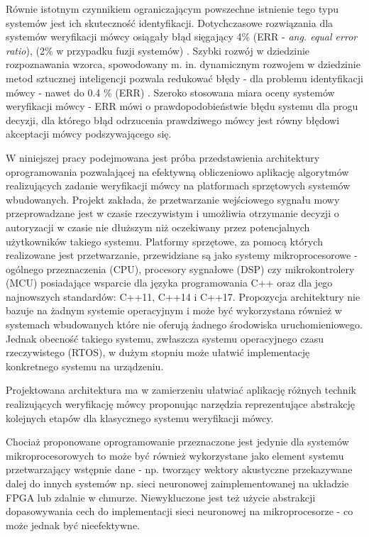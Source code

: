 Równie istotnym czynnikiem ograniczającym powszechne istnienie tego typu systemów jest ich skuteczność identyfikacji. Dotychczasowe rozwiązania dla systemów weryfikacji mówcy osiągały błąd sięgający 4\% (ERR - \textit{ang. equal error ratio}), (2\% w przypadku fuzji systemów) \cite{overview}. Szybki rozwój w dziedzinie rozpoznawania wzorca, spowodowany m. in. dynamicznym rozwojem w dziedzinie metod sztucznej inteligencji pozwala redukować błędy - dla problemu identyfikacji mówcy - nawet do 0.4 \% (ERR) \cite{deepfeaturelearning2017err}. Szeroko stosowana miara oceny systemów weryfikacji mówcy - ERR mówi o prawdopodobieństwie błędu systemu dla progu decyzji, dla którego błąd odrzucenia prawdziwego mówcy jest równy błędowi akceptacji mówcy podszywającego się.  

W niniejszej pracy podejmowana jest próba przedstawienia architektury oprogramowania pozwalającej na efektywną obliczeniowo aplikację algorytmów realizujących zadanie weryfikacji mówcy na platformach sprzętowych systemów wbudowanych. Projekt zakłada, że przetwarzanie wejściowego sygnału mowy przeprowadzane jest w czasie rzeczywistym i umożliwia otrzymanie decyzji o autoryzacji w czasie nie dłuższym niż oczekiwany przez potencjalnych użytkowników takiego systemu. Platformy sprzętowe, za pomocą których realizowane jest przetwarzanie, przewidziane są jako systemy mikroprocesorowe - ogólnego przeznaczenia (CPU), procesory sygnałowe (DSP) czy mikrokontrolery (MCU) posiadające wsparcie dla języka programowania C++ oraz dla jego najnowszych standardów: C++11, C++14 i C++17. Propozycja architektury nie bazuje na żadnym systemie operacyjnym i może być wykorzystana również w systemach wbudowanych które nie oferują żadnego środowiska uruchomieniowego. Jednak obecność takiego systemu, zwłaszcza systemu operacyjnego czasu rzeczywistego (RTOS), w dużym stopniu może ułatwić implementację konkretnego systemu na urządzeniu. 

Projektowana architektura ma w zamierzeniu ułatwiać aplikację różnych technik realizujących weryfikację mówcy proponując narzędzia reprezentujące abstrakcję kolejnych etapów dla klasycznego systemu weryfikacji mówcy.

Chociaż proponowane oprogramowanie przeznaczone jest jedynie dla systemów mikroprocesorowych to może być również wykorzystane jako element systemu przetwarzający wstępnie dane - np. tworzący wektory akustyczne przekazywane dalej do innych systemów np. sieci neuronowej zaimplementowanej na układzie FPGA lub zdalnie w chmurze. Niewykluczone jest też użycie abstrakcji dopasowywania cech do implementacji sieci neuronowej na mikroprocesorze - co może jednak być nieefektywne. 

